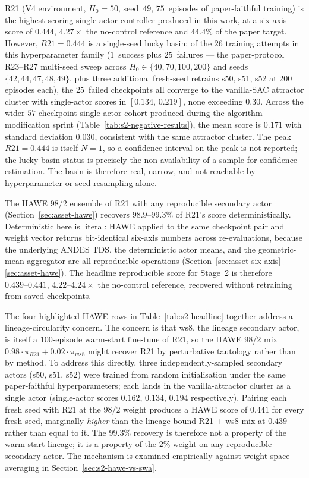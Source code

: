 \documentclass{unnc-fyp}
\begin{document}
R21 (V4 environment, $H_0 = 50$, seed~$49$, $75$~episodes of
paper-faithful training) is the highest-scoring single-actor
controller produced in this work, at a six-axis score of $0.444$,
$4.27\times$ the no-control reference and $44.4\%$ of the paper
target.
However, $R21 = 0.444$ is a single-seed lucky basin: of the $26$
training attempts in this hyperparameter family ($1$~success plus
$25$~failures --- the paper-protocol R23--R27 multi-seed sweep
across $H_0 \in \{40, 70, 100, 200\}$ and seeds
$\{42, 44, 47, 48, 49\}$, plus three additional fresh-seed
retrains s50, s51, s52 at $200$ episodes each), the $25$~failed
checkpoints all converge to the vanilla-SAC attractor cluster
with single-actor scores in $[0.134,\, 0.219]$, none exceeding
$0.30$.
Across the wider $57$-checkpoint single-actor cohort produced
during the algorithm-modification sprint
(Table~\ref{tab:s2-negative-results}), the mean score is $0.171$
with standard deviation $0.030$, consistent with the same
attractor cluster.
The peak $R21 = 0.444$ is itself $N=1$, so a confidence interval
on the peak is not reported; the lucky-basin status is precisely
the non-availability of a sample for confidence estimation.
The basin is therefore real, narrow, and not reachable by
hyperparameter or seed resampling alone.

The HAWE 98/2 ensemble of R21 with any reproducible secondary
actor (Section~\ref{sec:asset-hawe}) recovers $98.9\text{--}99.3\%$
of R21's score deterministically.
Deterministic here is literal: HAWE applied to the same checkpoint
pair and weight vector returns bit-identical six-axis numbers
across re-evaluations, because the underlying ANDES TDS, the
deterministic actor means, and the geometric-mean aggregator are
all reproducible operations
(Section~\ref{sec:asset-six-axis}--\ref{sec:asset-hawe}).
The headline reproducible score for Stage~2 is therefore
$0.439\text{--}0.441$, $4.22\text{--}4.24\times$ the no-control
reference, recovered without retraining from saved checkpoints.

The four highlighted HAWE rows in Table~\ref{tab:s2-headline}
together address a lineage-circularity concern.
The concern is that ws8, the lineage secondary actor, is itself a
$100$-episode warm-start fine-tune of R21, so the HAWE 98/2 mix
$0.98 \cdot \pi_{R21} + 0.02 \cdot \pi_{ws8}$ might recover R21 by
perturbative tautology rather than by method.
To address this directly, three independently-sampled secondary
actors (s50, s51, s52) were trained from random initialisation
under the same paper-faithful hyperparameters; each lands in the
vanilla-attractor cluster as a single actor (single-actor scores
$0.162$, $0.134$, $0.194$ respectively).
Pairing each fresh seed with R21 at the $98/2$ weight produces a
HAWE score of $0.441$ for every fresh seed, marginally
\emph{higher} than the lineage-bound R21 + ws8 mix at $0.439$
rather than equal to it.
The $99.3\%$ recovery is therefore not a property of the
warm-start lineage; it is a property of the $2\%$ weight on any
reproducible secondary actor.
The mechanism is examined empirically against weight-space
averaging in Section~\ref{sec:s2-hawe-vs-swa}.
\end{document}
